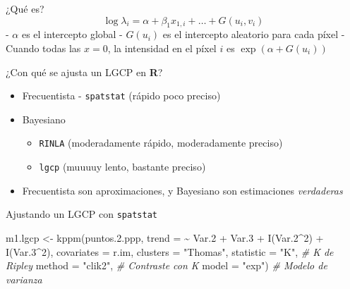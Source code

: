 \documentclass[
  11pt,
  ignorenonframetext,
]{beamer}
\newenvironment{Shaded}{}{}
\newcommand{\AttributeTok}[1]{\textcolor[rgb]{0.49,0.56,0.16}{#1}}
\newcommand{\CommentTok}[1]{\textcolor[rgb]{0.38,0.63,0.69}{\textit{#1}}}
\newcommand{\DecValTok}[1]{\textcolor[rgb]{0.25,0.63,0.44}{#1}}
\newcommand{\FloatTok}[1]{\textcolor[rgb]{0.25,0.63,0.44}{#1}}
\newcommand{\FunctionTok}[1]{\textcolor[rgb]{0.02,0.16,0.49}{#1}}
\newcommand{\NormalTok}[1]{#1}
\newcommand{\OtherTok}[1]{\textcolor[rgb]{0.00,0.44,0.13}{#1}}
\newcommand{\SpecialCharTok}[1]{\textcolor[rgb]{0.25,0.44,0.63}{#1}}
\newcommand{\StringTok}[1]{\textcolor[rgb]{0.25,0.44,0.63}{#1}}
\providecommand{\tightlist}{%
  \setlength{\itemsep}{0pt}\setlength{\parskip}{0pt}}
\begin{document}
\begin{frame}{¿Qué es?}
\protect\hypertarget{quuxe9-es-1}{}
\[\log \lambda_i = \alpha + \beta_1 x_{1,i} + \dots + G(u_i, v_i)\] -
\(\alpha\) es el intercepto global - \(G(u_i)\) es el intercepto
aleatorio para cada píxel - Cuando todas las \(x = 0\), la intensidad en
el píxel \(i\) es \(\exp(\alpha + G(u_i))\)
\end{frame}

\begin{frame}[fragile]{¿Con qué se ajusta un LGCP en \textbf{R}?}
\protect\hypertarget{con-quuxe9-se-ajusta-un-lgcp-en-r}{}
\begin{itemize}
\item
  Frecuentista - \texttt{spatstat} (rápido poco preciso)
\item
  Bayesiano

  \begin{itemize}
  \tightlist
  \item
    \texttt{RINLA} (moderadamente rápido, moderadamente preciso)
  \item
    \texttt{lgcp} (muuuuy lento, bastante preciso)
  \end{itemize}
\item
  Frecuentista son aproximaciones, y Bayesiano son estimaciones
  \emph{verdaderas}
\end{itemize}
\end{frame}

\begin{frame}[fragile]{Ajustando un LGCP con \texttt{spatstat}}
\protect\hypertarget{ajustando-un-lgcp-con-spatstat}{}
\begin{Shaded}
\begin{Highlighting}[]
\NormalTok{m1.lgcp }\OtherTok{\textless{}{-}} \FunctionTok{kppm}\NormalTok{(puntos.}\FloatTok{2.}\NormalTok{ppp,}
                \AttributeTok{trend =} \SpecialCharTok{\textasciitilde{}}\NormalTok{ Var}\FloatTok{.2} \SpecialCharTok{+}\NormalTok{ Var}\FloatTok{.3} \SpecialCharTok{+} \FunctionTok{I}\NormalTok{(Var}\FloatTok{.2}\SpecialCharTok{\^{}}\DecValTok{2}\NormalTok{) }\SpecialCharTok{+} \FunctionTok{I}\NormalTok{(Var}\FloatTok{.3}\SpecialCharTok{\^{}}\DecValTok{2}\NormalTok{),}
                \AttributeTok{covariates =}\NormalTok{ r.im,}
                \AttributeTok{clusters =} \StringTok{"Thomas"}\NormalTok{,}
                \AttributeTok{statistic =} \StringTok{"K"}\NormalTok{, }\CommentTok{\# K de Ripley}
                \AttributeTok{method =} \StringTok{"clik2"}\NormalTok{, }\CommentTok{\# Contraste con K}
                \AttributeTok{model =} \StringTok{"exp"}\NormalTok{) }\CommentTok{\# Modelo de varianza}
\end{Highlighting}
\end{Shaded}
\end{frame}
\end{document}

